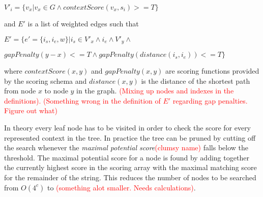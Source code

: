 \documentclass{article}
\begin{document}
\par
$V'_i=\{v_x|v_x \in G \wedge contextScore(v_x, s_i) >= T\}$\\
\par\noindent
and $E'$ is a list of weighted edges such that\\
\par
$E'=\{e'=\{i_s, i_e, w\}|i_s \in V'_x \wedge i_e \wedge V'_y \wedge$\par$gapPenalty(y - x) <= T \wedge gapPenalty(distance(i_s, i_e)) <= T\}$\\
\par\noindent
where $contextScore(x, y)$ and $gapPenalty(x, y)$ are scoring functions provided by the scoring schema and $distance(x, y)$ is the distance of the shortest path from node $x$ to node $y$ in the graph. \textcolor{red}{(Mixing up nodes and indexes in the definitions). (Something wrong in the definition of $E'$ regarding gap penalties. Figure out what)}\\
\par\noindent
In theory every leaf node has to be visited in order to check the score for every represented context in the tree. In practice the tree can be pruned by cutting off the search whenever the \textit{maximal potential score}\textcolor{red}{(clumsy name)} falls below the threshold. The maximal potential score for a node is found by adding together the currently highest score in the scoring array with the maximal matching score for the remainder of the string. This reduces the number of nodes to be searched from $O(4^c)$ to \textcolor{red}{(something alot smaller. Needs calculations)}.\\
\par\noindent
\par
\end{document}
